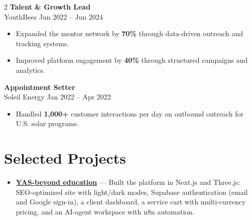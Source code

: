 \documentclass[a4paper,10pt]{article}
\begin{document}
\begin{multicols}{2}
\textbf{Talent \& Growth Lead} \\
YouthBees \hfill Jun 2022 -- Jun 2024
\begin{itemize}[leftmargin=1em]
  \item Expanded the mentor network by \textbf{70\%} through data-driven outreach and tracking systems.
  \item Improved platform engagement by \textbf{40\%} through structured campaigns and analytics. \\
\end{itemize}

\textbf{Appointment Setter} \\
Soleil Energy \hfill Jan 2022 -- Apr 2022
\begin{itemize}[leftmargin=1em]
  \item Handled \textbf{1,000+} customer interactions per day on outbound outreach for U.S. solar programs.
\end{itemize}

\vspace{6pt}
\section*{Selected Projects}
\begin{itemize}[leftmargin=1em]
  \item \textbf{\href{https://box-the-third.github.io}{YAS-beyond education}} --- Built the platform in Next.js and Three.js: SEO-optimized site with light/dark modes, Supabase authentication (email and Google sign-in), a client dashboard, a service cart with multi-currency pricing, and an AI-agent workspace with n8n automation.
\end{itemize}

\vfill\null
\end{multicols}
\end{document}
